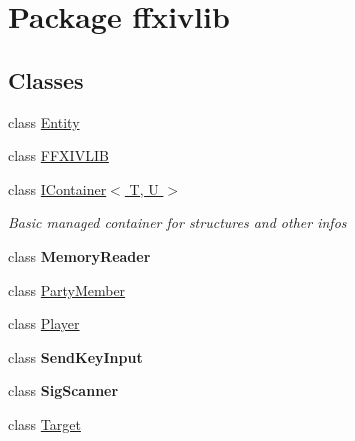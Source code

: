 \hypertarget{namespaceffxivlib}{\section{Package ffxivlib}
\label{namespaceffxivlib}
}
\subsection*{Classes}
\begin{DoxyCompactItemize}
\item 
class \hyperlink{classffxivlib_1_1_entity}{Entity}
\item 
class \hyperlink{classffxivlib_1_1_f_f_x_i_v_l_i_b}{F\-F\-X\-I\-V\-L\-I\-B}
\item 
class \hyperlink{classffxivlib_1_1_i_container_3_01_t_00_01_u_01_4}{I\-Container$<$ T, U $>$}
\begin{DoxyCompactList}\small\item\em Basic managed container for structures and other infos \end{DoxyCompactList}\item 
class {\bfseries Memory\-Reader}
\item 
class \hyperlink{classffxivlib_1_1_party_member}{Party\-Member}
\item 
class \hyperlink{classffxivlib_1_1_player}{Player}
\item 
class {\bfseries Send\-Key\-Input}
\item 
class {\bfseries Sig\-Scanner}
\item 
class \hyperlink{classffxivlib_1_1_target}{Target}
\end{DoxyCompactItemize}
